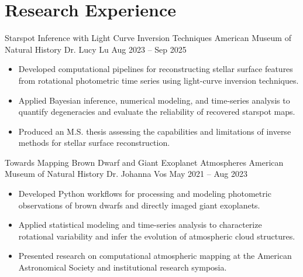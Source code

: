 \section{Research Experience}

\researchentry
  {Starspot Inference with Light Curve Inversion Techniques}
  {American Museum of Natural History}
  {Dr. Lucy Lu}
  {Aug 2023 -- Sep 2025}

\begin{itemize}[
  leftmargin=1em,
  label={--},
  itemsep=3pt,
  topsep=0pt,
  parsep=0pt,
  partopsep=0pt
]
  \item Developed computational pipelines for reconstructing stellar surface features from rotational photometric time series using light-curve inversion techniques.

  \item Applied Bayesian inference, numerical modeling, and time-series analysis to quantify degeneracies and evaluate the reliability of recovered starspot maps.

  \item Produced an M.S. thesis assessing the capabilities and limitations of inverse methods for stellar surface reconstruction.
\end{itemize}

\vspace{0.4em}

\researchentry
  {Towards Mapping Brown Dwarf and Giant Exoplanet Atmospheres}
  {American Museum of Natural History}
  {Dr. Johanna Vos}
  {May 2021 -- Aug 2023}

\begin{itemize}[
  leftmargin=1em,
  label={--},
  itemsep=3pt,
  topsep=0pt,
  parsep=0pt,
  partopsep=0pt
]
  \item Developed Python workflows for processing and modeling photometric observations of brown dwarfs and directly imaged giant exoplanets.

  \item Applied statistical modeling and time-series analysis to characterize rotational variability and infer the evolution of atmospheric cloud structures.

  \item Presented research on computational atmospheric mapping at the American Astronomical Society and institutional research symposia.
\end{itemize}

\vspace{0.4em}

